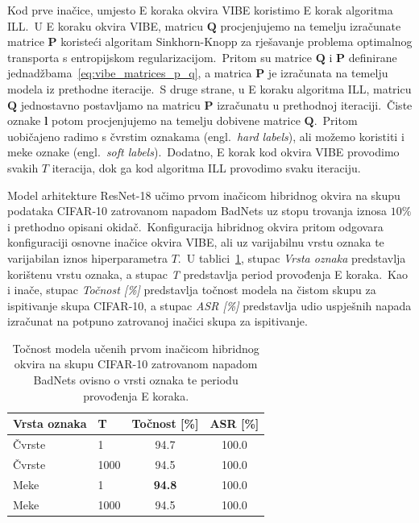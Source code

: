 \documentclass[diplomskirad]{fer}
\begin{document}
Kod prve inačice, umjesto E koraka okvira VIBE koristimo E korak algoritma ILL.\ 
U E koraku okvira VIBE, matricu $\bm{Q}$ procjenjujemo na temelju izračunate matrice $\bm{P}$ koristeći algoritam Sinkhorn-Knopp za rješavanje problema optimalnog transporta s entropijskom regularizacijom.\ 
Pritom su matrice $\bm{Q}$ i $\bm{P}$ definirane jednadžbama~\ref{eq:vibe_matrices_p_q}, a matrica $\bm{P}$ je izračunata na temelju modela iz prethodne iteracije.\ 
S druge strane, u E koraku algoritma ILL, matricu $\bm{Q}$ jednostavno postavljamo na matricu $\bm{P}$ izračunatu u prethodnoj iteraciji.\ 
Čiste oznake $\bm{l}$ potom procjenjujemo na temelju dobivene matrice $\bm{Q}$.\ Pritom uobičajeno radimo s čvrstim oznakama (engl.\ \textit{hard labels}), ali možemo koristiti i meke oznake (engl.\ \textit{soft labels}).\ 
Dodatno, E korak kod okvira VIBE provodimo svakih $T$ iteracija, dok ga kod algoritma ILL provodimo svaku iteraciju.\ 

Model arhitekture ResNet-18 učimo prvom inačicom hibridnog okvira na skupu podataka CIFAR-10 zatrovanom napadom BadNets uz stopu trovanja iznosa $10\%$ i prethodno opisani okidač.\ 
Konfiguracija hibridnog okvira pritom odgovara konfiguraciji osnovne inačice okvira VIBE, ali uz varijabilnu vrstu oznaka te varijabilan iznos hiperparametra $T$.\ 
U tablici~\ref{tbl:trovanje_hibrid1}, stupac \textit{Vrsta oznaka} predstavlja korištenu vrstu oznaka, a stupac \textit{T} predstavlja period provođenja E koraka.\ 
Kao i inače, stupac \textit{Točnost [\%]} predstavlja točnost modela na čistom skupu za ispitivanje skupa CIFAR-10, a stupac \textit{ASR [\%]} predstavlja udio uspješnih napada izračunat na potpuno zatrovanoj inačici skupa za ispitivanje.\  

\begin{table}[htb]
  \caption{Točnost modela učenih prvom inačicom hibridnog okvira na skupu CIFAR-10 zatrovanom napadom BadNets ovisno o vrsti oznaka te periodu provođenja E koraka.}
  \label{tbl:trovanje_hibrid1}
  \centering
  \begin{tabular}{ll||cc}
  Vrsta oznaka & T & Točnost [\%] & ASR [\%]\\ \hline \hline
  Čvrste & 1 & 94.7 & 100.0 \\
  Čvrste & 1000 & 94.5 & 100.0 \\ \hline
  Meke & 1 & \textbf{94.8} & 100.0 \\ 
  Meke & 1000 & 94.5 & 100.0 \\ 
  \end{tabular}
\end{table}
\end{document}
